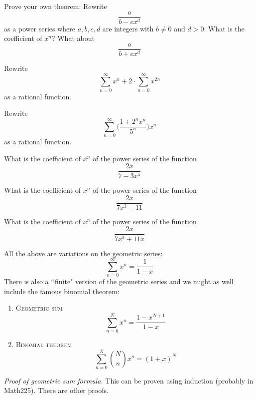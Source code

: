 \newpage
\newpage

\newpage
\begin{ex}
Prove your own theorem:
Rewrite
\[
\frac{a}{b - cx^d}
\]
as a power series where $a,b,c,d$ are integers
with $b \neq 0$ and $d > 0$. 
What is the coefficient of $x^n$?
What about
\[
\frac{a}{b + cx^d}
\]
\end{ex}

\newpage
\begin{ex}
Rewrite
\[
\sum_{n=0}^\infty x^n
+ 
2 \cdot \sum_{n=0}^\infty x^{2n} 
\]
as a rational function.
\end{ex}

\newpage
\begin{ex}
Rewrite
\[
\sum_{n=0}^\infty \biggl( \frac{1 + 2^nx^n}{5^n} \biggr) x^n 
\]
as a rational function.
\end{ex}

\newpage
\begin{ex}
What is the coefficient of $x^n$ of the power series of the function
\[
\frac{2x}{7 - 3x^5}
\]
\end{ex}


\newpage
\begin{ex}
What is the coefficient of $x^n$ of the power series of the function
\[
\frac{2x}{7x^3 - 11}
\]
\end{ex}



\newpage
\begin{ex}
What is the coefficient of $x^n$ of the power series of the function
\[
\frac{2x}{7x^3 + 11x}
\]
\end{ex}



\newpage
All the above are variations on the geometric series:
\[
\sum_{n=0}^\infty x^n = \frac{1}{1 - x}
\]
There is also a \lq\lq finite" version of the geometric series
and we might as well include the famous binomial theorem:

\begin{enumerate}[nosep]
\item[]\textsc{Geometric sum}
  \[
  \sum_{n=0}^N x^n = \frac{1 - x^{N+1}}{1 - x}
  \]
\item[]\textsc{Binomial theorem}
  \[
  \sum_{n=0}^N \binom{N}{n} x^n = (1 + x)^N
  \]
\end{enumerate}



\textit{Proof of geometric sum formula.}
This can be proven using induction (probably in Math225).
There are other proofs.

